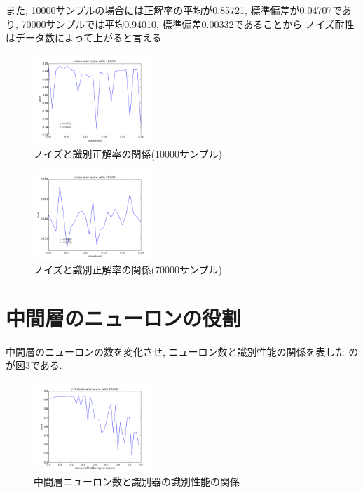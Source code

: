 \documentclass[10pt,a4paper,twocolumn]{jarticle}
\begin{document}
また, 10000サンプルの場合には正解率の平均が0.85721, 標準偏差が0.04707であり, 
70000サンプルでは平均0.94010, 標準偏差0.00332であることから
ノイズ耐性はデータ数によって上がると言える. 
\begin{figure}[htbp] 
  \centering
  \includegraphics[width=0.4\textwidth]{assets/img/noise_test_mnist_10000.pdf}
  \caption{ノイズと識別正解率の関係(10000サンプル)}
  \label{fig:noise-test-score-var-10000}
\end{figure}
\begin{figure}[htbp] 
  \centering
  \includegraphics[width=0.4\textwidth]{assets/img/noise_test_mnist_70000.pdf}
  \caption{ノイズと識別正解率の関係(70000サンプル)}
  \label{fig:noise-test-score-var-70000}
\end{figure}

\section{中間層のニューロンの役割}
中間層のニューロンの数を変化させ, ニューロン数と識別性能の関係を表した
のが図\ref{fig:hidden-neuron-role}である. 
\begin{figure}[htbp]
  \centering
  \includegraphics[width=0.4\textwidth]{assets/img/hidden_layer_analyze_mnist_score_70000.pdf}
  \caption{中間層ニューロン数と識別器の識別性能の関係}
  \label{fig:hidden-neuron-role}
\end{figure}
\end{document}
